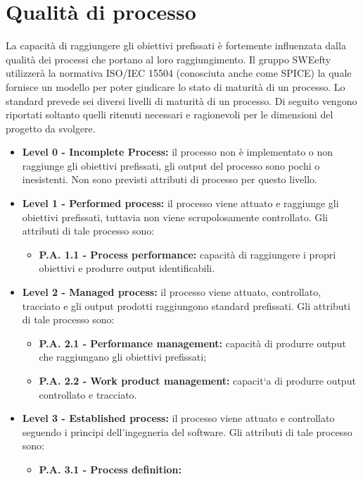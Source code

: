\section{Qualità di processo}
La capacità di raggiungere gli obiettivi prefissati è fortemente influenzata dalla qualità dei processi che portano al loro raggiungimento. Il gruppo SWEefty utilizzerà la normativa ISO/IEC 15504 (conosciuta anche come SPICE) la quale fornisce un modello per poter giudicare lo stato di maturità di un processo.
Lo standard prevede sei diversi livelli di maturità di un processo. Di seguito vengono riportati soltanto quelli ritenuti necessari e ragionevoli per le dimensioni del progetto da svolgere.
\begin{itemize}
	\item \textbf{Level 0 - Incomplete Process:}
	il processo non è implementato o non raggiunge  gli  obiettivi  prefissati,  gli  output  del  processo  sono  pochi  o	inesistenti.  
	Non sono previsti attributi di processo per questo livello. 
	\item \textbf{Level 1 - Performed process:}
		il  processo  viene  attuato  e  raggiunge  gli
		obiettivi prefissati, tuttavia non viene scrupolosamente controllato.  Gli
		attributi di tale processo sono:
		\begin{itemize}
			\item \textbf{P.A. 1.1 - Process performance:}
			capacità  di  raggiungere  i  propri
			obiettivi e produrre output identificabili.
		\end{itemize}
	\item \textbf{Level 2 - Managed process:}
		il processo viene attuato, controllato, tracciato e gli output prodotti raggiungono standard prefissati.  Gli attributi di tale processo sono:
		\begin{itemize}
			\item \textbf{P.A. 2.1 - Performance management:}
				capacità  di  produrre  output che raggiungano gli obiettivi prefissati;
			\item \textbf{P.A. 2.2 - Work product management:}
				capacit`a di produrre output controllato e tracciato.
		\end{itemize}
	\item \textbf{Level 3 - Established process:}
		il processo viene attuato e controllato seguendo  i  principi  dell’ingegneria  del  software.   Gli  attributi  di  tale processo sono:
		\begin{itemize}
			\item \textbf{P.A. 3.1 - Process definition:}

\end{itemize}
\end{itemize}
